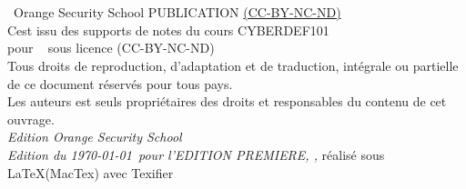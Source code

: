 


\newpage

~\vfill
\thispagestyle{empty}

\INFOGitHubS

\noindent {\Huge\ccbyncndeu}\\ 

\noindent \the\year~Orange Security School PUBLICATION \href{https://creativecommons.org/licenses/by-nc-nd/2.0/fr/}{(CC-BY-NC-ND)}\\ %

\noindent C\edoc est issu des supports de notes du cours CYBERDEF101\\ 
pour \localcourseinstitute ~ sous licence (CC-BY-NC-ND)\\






\noindent Tous droits de reproduction, d’adaptation et de traduction, intégrale ou partielle de ce document réservés pour tous pays.\\

\noindent Les auteurs est seuls propriétaires des droits et responsables du contenu de cet ouvrage.\\

\noindent \textit{Edition Orange Security School} \\

\noindent \textit{Edition du \today~pour l'EDITION PREMIERE,  \printer, } réalisé sous \LaTeX (MacTex) avec Texifier \faApple


